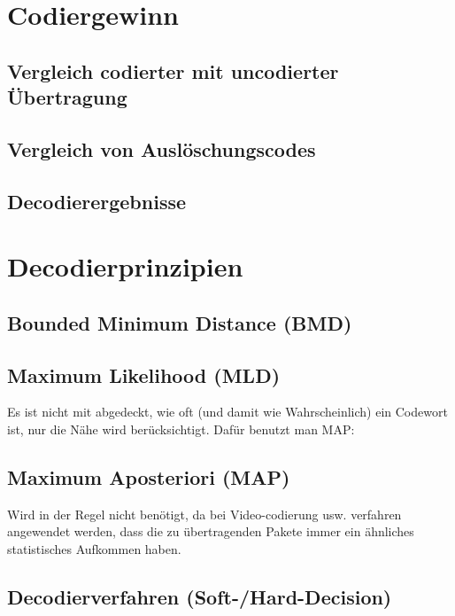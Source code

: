 \section{Codiergewinn}
\subsection{Vergleich codierter mit uncodierter Übertragung}
\subsection{Vergleich von Auslöschungscodes}
\subsection{Decodierergebnisse}
\section{Decodierprinzipien}
\subsection{Bounded Minimum Distance (BMD)}
\subsection{Maximum Likelihood (MLD)}
Es ist nicht mit abgedeckt, wie oft (und damit wie Wahrscheinlich) ein Codewort ist, nur die Nähe wird berücksichtigt. Dafür benutzt man MAP:
\subsection{Maximum Aposteriori (MAP)}
Wird in der Regel nicht benötigt, da bei Video-codierung usw. verfahren angewendet werden, dass die zu übertragenden Pakete immer ein ähnliches statistisches Aufkommen haben.

\subsection{Decodierverfahren (Soft-/Hard-Decision)}







